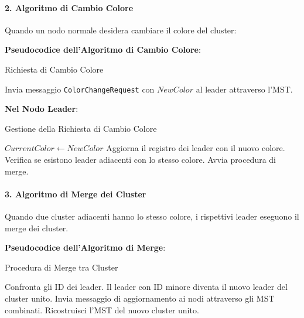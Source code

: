 \documentclass[12pt, a4paper]{report}
\begin{document}
\paragraph{2. Algoritmo di Cambio Colore}

Quando un nodo normale desidera cambiare il colore del cluster:

\textbf{Pseudocodice dell'Algoritmo di Cambio Colore}:

\begin{algorithm}[H]
\caption{Richiesta di Cambio Colore}
\begin{algorithmic}[1]
    \State Invia messaggio \texttt{ColorChangeRequest} con $NewColor$ al leader attraverso l'MST.
\EndProcedure
\end{algorithmic}
\end{algorithm}

\textbf{Nel Nodo Leader}:

\begin{algorithm}[H]
\caption{Gestione della Richiesta di Cambio Colore}
\begin{algorithmic}[1]
        \State $CurrentColor \gets NewColor$
        \State Aggiorna il registro dei leader con il nuovo colore.
        \State Verifica se esistono leader adiacenti con lo stesso colore.
            \State Avvia procedura di merge.
        \EndIf
    \EndIf
\EndProcedure
\end{algorithmic}
\end{algorithm}

\paragraph{3. Algoritmo di Merge dei Cluster}

Quando due cluster adiacenti hanno lo stesso colore, i rispettivi leader eseguono il merge dei cluster.

\textbf{Pseudocodice dell'Algoritmo di Merge}:

\begin{algorithm}[H]
\caption{Procedura di Merge tra Cluster}
\begin{algorithmic}[1]
    \State Confronta gli ID dei leader.
        \State Il leader con ID minore diventa il nuovo leader del cluster unito.
    \EndIf
    \State Invia messaggio di aggiornamento ai nodi attraverso gli MST combinati.
    \State Ricostruisci l'MST del nuovo cluster unito.
\EndProcedure
\end{algorithmic}
\end{algorithm}
\end{document}
